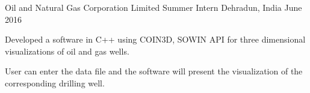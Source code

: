 \vspace{-0.4cm}
\begin{cventries}
\vspace{-0.1cm}
  \cventry
    {Oil and Natural Gas Corporation Limited}
    {Summer Intern}
    {Dehradun, India}
    {June 2016}
    {
      \begin{cvitems}
        \item {\small Developed a software in C++ using COIN3D, SOWIN API  for three dimensional visualizations of oil and gas wells.}
        \item {\small User can enter the data file and the software will present the visualization of the corresponding drilling well.}
      \end{cvitems}
    }  
\end{cventries}
